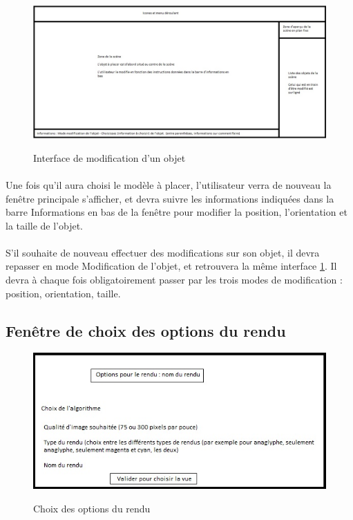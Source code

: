 \begin{figure}[h]
  \centering
  \includegraphics[scale=0.5]{interfacemodifs}
  \label{fig:interfacemodifs}
  \caption{Interface de modification d'un objet}
\end{figure}

\paragraph{}
Une fois qu’il aura choisi le modèle à placer, l’utilisateur verra de nouveau la fenêtre principale s’afficher, et devra suivre les informations indiquées dans la barre Informations en bas de la fenêtre pour modifier la position, l’orientation et la taille de l’objet.

\paragraph{}
S’il souhaite de nouveau effectuer des modifications sur son objet, il devra repasser en mode Modification de l’objet, et retrouvera la même interface \ref{fig:interfacemodifs}. Il devra à chaque fois obligatoirement passer par les trois modes de modification : position, orientation, taille.

\subsection{Fenêtre de choix des options du rendu}

\begin{figure}[h]
  \centering
  \includegraphics[scale=0.6]{choixoptionsrendu}
  \label{fig:optionsrendu}
  \caption{Choix des options du rendu}
\end{figure}

